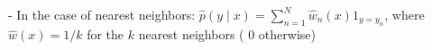 
- In the case of nearest neighbors:
$
\hat{p}(y \mid x)=\sum_{n=1}^{N} \hat{w}_{n}(x) 1_{y=y_{n}}
$, 
where $\hat{w}(x)=1 / k$ for the $k$ nearest neighbors ( 0 otherwise)




